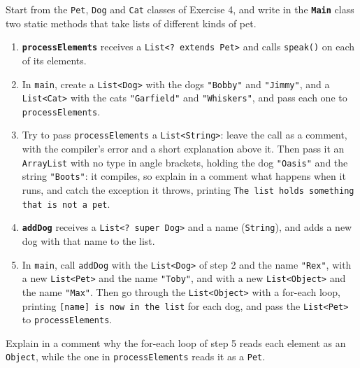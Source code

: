 Start from the \texttt{Pet}, \texttt{Dog} and \texttt{Cat} classes of Exercise 4, and write in the \textbf{\texttt{Main}} class two static methods that take lists of different kinds of pet.

\begin{enumerate}

    \item \textbf{\texttt{processElements}} receives a \texttt{List<? extends Pet>} and calls \texttt{speak()} on each of its elements.

    \item In \texttt{main}, create a \texttt{List<Dog>} with the dogs \texttt{"Bobby"} and \texttt{"Jimmy"}, and a \texttt{List<Cat>} with the cats \texttt{"Garfield"} and \texttt{"Whiskers"}, and pass each one to \texttt{processElements}.

    \item Try to pass \texttt{processElements} a \texttt{List<String>}: leave the call as a comment, with the compiler's error and a short explanation above it. Then pass it an \texttt{ArrayList} with no type in angle brackets, holding the dog \texttt{"Oasis"} and the string \texttt{"Boots"}: it compiles, so explain in a comment what happens when it runs, and catch the exception it throws, printing \texttt{The list holds something that is not a pet}.

    \item \textbf{\texttt{addDog}} receives a \texttt{List<? super Dog>} and a name (\texttt{String}), and adds a new dog with that name to the list.

    \item In \texttt{main}, call \texttt{addDog} with the \texttt{List<Dog>} of step 2 and the name \texttt{"Rex"}, with a new \texttt{List<Pet>} and the name \texttt{"Toby"}, and with a new \texttt{List<Object>} and the name \texttt{"Max"}. Then go through the \texttt{List<Object>} with a for-each loop, printing \texttt{[name] is now in the list} for each dog, and pass the \texttt{List<Pet>} to \texttt{processElements}.

\end{enumerate}

Explain in a comment why the for-each loop of step 5 reads each element as an \texttt{Object}, while the one in \texttt{processElements} reads it as a \texttt{Pet}.
